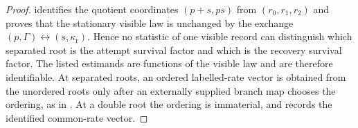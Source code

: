 \begin{proof}
 identifies the quotient
coordinates \((p+s,ps)\) from \((r_0,r_1,r_2)\) and proves that the stationary
visible law is unchanged by the exchange
\((p,\Gamma)\leftrightarrow(s,\kappa_{\mathrm r})\).  Hence no statistic of
one visible record can distinguish which separated root is the attempt
survival factor and which is the recovery survival factor.  The listed
estimands are functions of the visible law and are therefore identifiable.
At separated roots, an ordered labelled-rate vector is obtained from the
unordered roots only after an externally supplied branch map chooses the
ordering, as in .  At a double root the
ordering is immaterial, and  records the
identified common-rate vector.
\end{proof}

